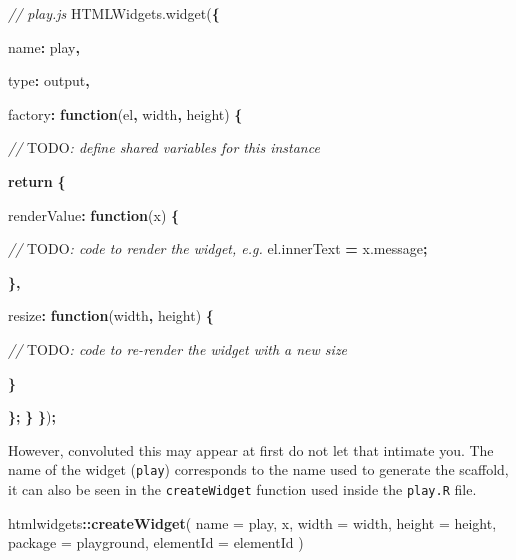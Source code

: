 \documentclass[
  10pt,
]{krantz}
\makeatletter
\newenvironment{Shaded}{\begin{snugshade}}{\end{snugshade}}
\newcommand{\AlertTok}[1]{\textcolor[rgb]{0.33,0.33,0.33}{#1}}
\newcommand{\AttributeTok}[1]{\textcolor[rgb]{0.61,0.61,0.61}{#1}}
\newcommand{\CommentTok}[1]{\textcolor[rgb]{0.37,0.37,0.37}{\textit{#1}}}
\newcommand{\ControlFlowTok}[1]{\textcolor[rgb]{0.27,0.27,0.27}{\textbf{#1}}}
\newcommand{\DataTypeTok}[1]{\textcolor[rgb]{0.27,0.27,0.27}{#1}}
\newcommand{\KeywordTok}[1]{\textcolor[rgb]{0.27,0.27,0.27}{\textbf{#1}}}
\newcommand{\NormalTok}[1]{#1}
\newcommand{\OperatorTok}[1]{\textcolor[rgb]{0.43,0.43,0.43}{\textbf{#1}}}
\newcommand{\StringTok}[1]{\textcolor[rgb]{0.5,0.5,0.5}{#1}}
\newcommand{\VariableTok}[1]{\textcolor[rgb]{0,0,0}{#1}}
\newenvironment{kframe}{%
\medskip{}
\setlength{\fboxsep}{.8em}
 \def\at@end@of@kframe{}%
 \ifinner\ifhmode%
  \def\at@end@of@kframe{\end{minipage}}%
  \begin{minipage}{\columnwidth}%
 \fi\fi%
 \def\FrameCommand##1{\hskip\@totalleftmargin \hskip-\fboxsep
 \colorbox{shadecolor}{##1}\hskip-\fboxsep
     \hskip-\linewidth \hskip-\@totalleftmargin \hskip\columnwidth}%
 \MakeFramed {\advance\hsize-\width
   \@totalleftmargin\z@ \linewidth\hsize
   \@setminipage}}%
 {\par\unskip\endMakeFramed%
 \at@end@of@kframe}
\renewenvironment{Shaded}{\begin{kframe}}{\end{kframe}}
\makeatother
\begin{document}
\begin{Shaded}
\begin{Highlighting}[]
\CommentTok{// play.js}
\VariableTok{HTMLWidgets}\NormalTok{.}\AttributeTok{widget}\NormalTok{(}\OperatorTok{\{}

  \DataTypeTok{name}\OperatorTok{:} \StringTok{\textquotesingle{}play\textquotesingle{}}\OperatorTok{,}

  \DataTypeTok{type}\OperatorTok{:} \StringTok{\textquotesingle{}output\textquotesingle{}}\OperatorTok{,}

  \DataTypeTok{factory}\OperatorTok{:} \KeywordTok{function}\NormalTok{(el}\OperatorTok{,}\NormalTok{ width}\OperatorTok{,}\NormalTok{ height) }\OperatorTok{\{}

    \CommentTok{// }\AlertTok{TODO}\CommentTok{: define shared variables for this instance}

    \ControlFlowTok{return} \OperatorTok{\{}

      \DataTypeTok{renderValue}\OperatorTok{:} \KeywordTok{function}\NormalTok{(x) }\OperatorTok{\{}

        \CommentTok{// }\AlertTok{TODO}\CommentTok{: code to render the widget, e.g.}
        \VariableTok{el}\NormalTok{.}\AttributeTok{innerText} \OperatorTok{=} \VariableTok{x}\NormalTok{.}\AttributeTok{message}\OperatorTok{;}

      \OperatorTok{\},}

      \DataTypeTok{resize}\OperatorTok{:} \KeywordTok{function}\NormalTok{(width}\OperatorTok{,}\NormalTok{ height) }\OperatorTok{\{}

        \CommentTok{// }\AlertTok{TODO}\CommentTok{: code to re{-}render the widget with a new size}

      \OperatorTok{\}}

    \OperatorTok{\};}
  \OperatorTok{\}}
\OperatorTok{\}}\NormalTok{)}\OperatorTok{;}
\end{Highlighting}
\end{Shaded}

However, convoluted this may appear at first do not let that intimate you. The name of the widget (\texttt{play}) corresponds to the name used to generate the scaffold, it can also be seen in the \texttt{createWidget} function used inside the \texttt{play.R} file.

\begin{Shaded}
\begin{Highlighting}[]
\NormalTok{htmlwidgets}\OperatorTok{::}\KeywordTok{createWidget}\NormalTok{(}
  \DataTypeTok{name =} \StringTok{\textquotesingle{}play\textquotesingle{}}\NormalTok{,}
\NormalTok{  x,}
  \DataTypeTok{width =}\NormalTok{ width,}
  \DataTypeTok{height =}\NormalTok{ height,}
  \DataTypeTok{package =} \StringTok{\textquotesingle{}playground\textquotesingle{}}\NormalTok{,}
  \DataTypeTok{elementId =}\NormalTok{ elementId}
\NormalTok{)}
\end{Highlighting}
\end{Shaded}
\end{document}
